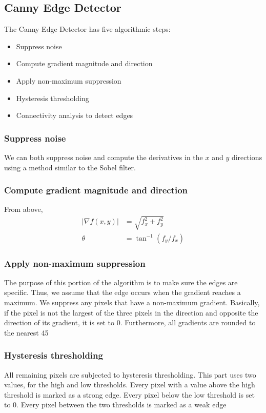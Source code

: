 \documentclass{article}
\begin{document}
\subsection{Canny Edge Detector}
The Canny Edge Detector has five algorithmic steps:
\begin{itemize}
\item Suppress noise
\item Compute gradient magnitude and direction
\item Apply non-maximum suppression
\item Hysteresis thresholding
\item Connectivity analysis to detect edges
\end{itemize}
\subsubsection{Suppress noise}
We can both suppress noise and compute the derivatives in the $x$ and $y$ directions using a method similar to the Sobel filter.
\subsubsection{Compute gradient magnitude and direction}
From above,
\begin{align*}
|\nabla f(x,y)| &= \sqrt{f_x^2+f_y^2}\\
\theta &= \tan^{-1}\left(f_y/f_x\right)
\end{align*}
\subsubsection{Apply non-maximum suppression}
The purpose of this portion of the algorithm is to make sure the edges are specific.  Thus, we assume that the edge occurs when the gradient reaches a maximum.  We suppress any pixels that have a non-maximum gradient.\newline
Basically, if the pixel is not the largest of the three pixels in the direction and opposite the direction of its gradient, it is set to 0.  Furthermore, all gradients are rounded to the nearest 45\degree
\subsubsection{Hysteresis thresholding}
All remaining pixels are subjected to hysteresis thresholding.  This part uses two values, for the high and low thresholds.  Every pixel with a value above the high threshold is marked as a strong edge.  Every pixel below the low threshold is set to 0.  Every pixel between the two thresholds is marked as a weak edge
\end{document}
